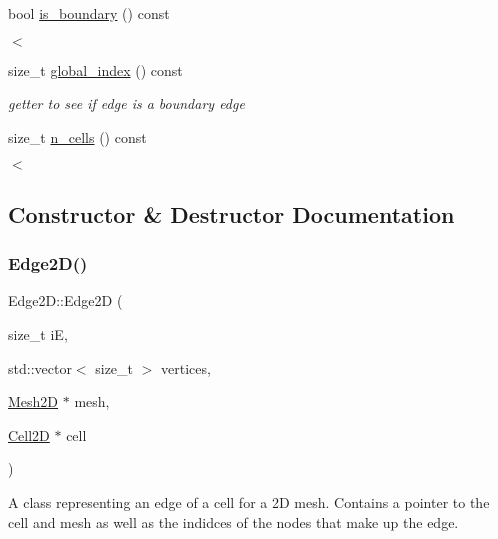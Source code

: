 \begin{DoxyCompactItemize}
bool \hyperlink{classMeshFramework2D_1_1Edge2D_a4d424503fe0983290847f16d479086c5}{is\+\_\+boundary} () const
\begin{DoxyCompactList}\small\item\em $<$ \end{DoxyCompactList}\item 
size\+\_\+t \hyperlink{classMeshFramework2D_1_1Edge2D_a066e7862a776306544c7d8258f9757b1}{global\+\_\+index} () const
\begin{DoxyCompactList}\small\item\em getter to see if edge is a boundary edge \end{DoxyCompactList}\item 
size\+\_\+t \hyperlink{classMeshFramework2D_1_1Edge2D_ae9b7473e8462129dfe870b0f5479ab95}{n\+\_\+cells} () const
\begin{DoxyCompactList}\small\item\em $<$ \end{DoxyCompactList}\end{DoxyCompactItemize}


\subsection{Constructor \& Destructor Documentation}
\mbox{\label{classMeshFramework2D_1_1Edge2D_af3b982ed5bedc795c29e621a675a9137}} 
\subsubsection{\texorpdfstring{Edge2\+D()}{Edge2D()}}
{\footnotesize\ttfamily Edge2\+D\+::\+Edge2D (\begin{DoxyParamCaption}\item[{size\+\_\+t}]{iE,  }\item[{std\+::vector$<$ size\+\_\+t $>$}]{vertices,  }\item[{\hyperlink{classMeshFramework2D_1_1Mesh2D}{Mesh2D} $\ast$}]{mesh,  }\item[{\hyperlink{classMeshFramework2D_1_1Cell2D}{Cell2D} $\ast$}]{cell }\end{DoxyParamCaption})}



A class representing an edge of a cell for a 2D mesh. Contains a pointer to the cell and mesh as well as the indidces of the nodes that make up the edge. 


